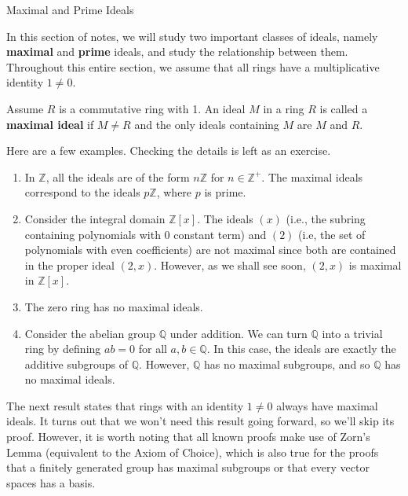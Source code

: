 \begin{section}{Maximal and Prime Ideals}

In this section of notes, we will study two important classes of ideals, namely \textbf{maximal} and \textbf{prime} ideals, and study the relationship between them. Throughout this entire section, we assume that all rings have a multiplicative identity $1\neq 0$. 

\begin{definition}
Assume $R$ is a commutative ring with 1. An ideal $M$ in a ring $R$ is called a \textbf{maximal ideal} if $M\neq R$ and the only ideals containing $M$ are $M$ and $R$.
\end{definition}

\begin{example}
Here are a few examples.  Checking the details is left as an exercise.
\begin{enumerate}[label=\textrm{(\alph*)}]
\item In $\mathbb{Z}$, all the ideals are of the form $n\mathbb{Z}$ for $n\in\mathbb{Z}^+$.  The maximal ideals correspond to the ideals $p\mathbb{Z}$, where $p$ is prime.
\item Consider the integral domain $\mathbb{Z}[x]$.  The ideals $(x)$ (i.e., the subring containing polynomials with 0 constant term) and $(2)$ (i.e, the set of polynomials with even coefficients) are not maximal since both are contained in the proper ideal $(2,x)$.  However, as we shall see soon, $(2,x)$ is maximal in $\mathbb{Z}[x]$.
\item The zero ring has no maximal ideals.
\item Consider the abelian group $\mathbb{Q}$ under addition.  We can turn $\mathbb{Q}$ into a trivial ring by defining $ab=0$ for all $a,b\in\mathbb{Q}$.  In this case, the ideals are exactly the additive subgroups of $\mathbb{Q}$.  However, $\mathbb{Q}$ has no maximal subgroups, and so $\mathbb{Q}$ has no maximal ideals.
\end{enumerate}
\end{example}

The next result states that rings with an identity $1\neq 0$ always have maximal ideals.  It turns out that we won't need this result going forward, so we'll skip its proof.  However, it is worth noting that all known proofs make use of Zorn's Lemma (equivalent to the Axiom of Choice), which is also true for the proofs that a finitely generated group has maximal subgroups or that every vector spaces has a basis.


\end{section}
